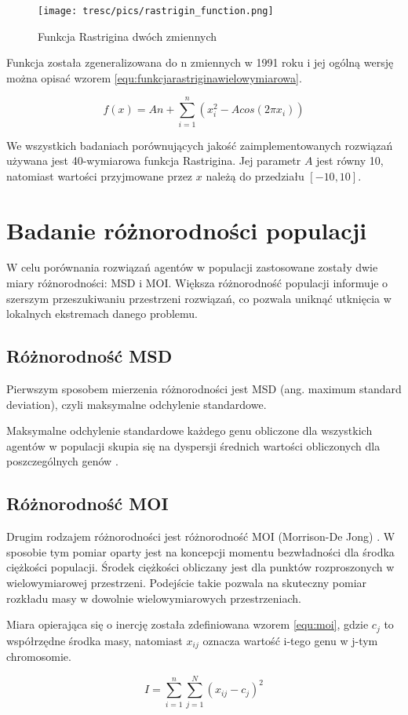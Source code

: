 \begin{figure}[H]
\begin{center} 
\texttt{[image: tresc/pics/rastrigin\_function.png]}
\caption{Funkcja Rastrigina dwóch zmiennych\footnotemark} 
\label{fig:rastrigin_function}
\end{center}
\end{figure}

Funkcja została zgeneralizowana do n zmiennych w 1991 roku \cite{rastrigin2} i jej ogólną wersję można opisać wzorem \ref{equ:funkcjarastriginawielowymiarowa}. 

\begin{equation}
 f(x) = A n + \sum_{i=1}^n(x_{i}^2 - A cos(2 \pi x_{i}))
 \label{equ:funkcjarastriginawielowymiarowa}
\end{equation}

We wszystkich badaniach porównujących jakość zaimplementowanych rozwiązań używana jest 40-wymiarowa funkcja Rastrigina. Jej parametr $A$ jest równy 10, natomiast wartości przyjmowane przez $x$ należą do przedziału $[-10, 10]$.

\section{Badanie różnorodności populacji}
\label{sec:roznorodnosc}

W celu porównania rozwiązań agentów w populacji zastosowane zostały dwie miary różnorodności: MSD i MOI. Większa różnorodność populacji informuje o szerszym przeszukiwaniu przestrzeni rozwiązań, co pozwala uniknąć utknięcia w lokalnych ekstremach danego problemu.

\subsection*{Różnorodność MSD}
Pierwszym sposobem mierzenia różnorodności jest MSD (ang. maximum standard deviation), czyli maksymalne odchylenie standardowe. 

Maksymalne odchylenie standardowe każdego genu obliczone dla wszystkich agentów w populacji skupia się na dyspersji średnich wartości obliczonych dla poszczególnych genów \cite{roznorodnosckisiel}.

\subsection*{Różnorodność MOI}
Drugim rodzajem różnorodności jest różnorodność MOI (Morrison-De Jong) \cite{roznorodnoscmoi}. W sposobie tym pomiar oparty jest na koncepcji momentu bezwładności dla środka ciężkości populacji. Środek ciężkości obliczany jest dla punktów rozproszonych w wielowymiarowej przestrzeni. Podejście takie pozwala na skuteczny pomiar rozkładu masy w dowolnie wielowymiarowych przestrzeniach. 

Miara opierająca się o inercję została zdefiniowana wzorem \ref{equ:moi}, gdzie $c_j$ to współrzędne środka masy, natomiast $x_{ij}$ oznacza wartość i-tego genu w j-tym chromosomie.

\begin{equation}
 I = \sum_{i=1}^n\sum_{j=1}^N(x_{ij} - c_j)^2
 \label{equ:moi}
\end{equation}


